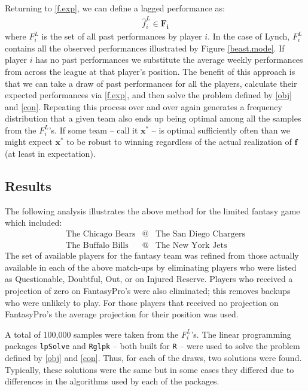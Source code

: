 \documentclass[10pt]{article}
\begin{document}
Returning to \eqref{f.exp}, we can define a lagged performance as:
\begin{gather}
\hat f_i^L \in \bm{F_i}
\end{gather}
where $F_i^L$ is the set of all past performances by player $i$.  In the case of Lynch, $F_i^L$ contains all the observed performances illustrated by Figure \ref{beast.mode}.  If player $i$ has no past performances we substitute the average weekly performances from across the league at that player's position.  The benefit of this approach is that we can take a draw of past performances for all the players, calculate their expected performances via \eqref{f.exp}, and then solve the problem defined by \eqref{obj} and \eqref{con}.  Repeating this process over and over again generates a frequency distribution that a given team also ends up being optimal among all the samples from the $F_i^L$'s.  If some team -- call it $\bm{x^*} $ -- is optimal sufficiently often than we might expect $\bm{x^*}$ to be robust to winning regardless of the actual realization of $\bm{f}$ (at least in expectation).

\subsection*{Results}

The following analysis illustrates the above method for the limited fantasy game which included:
\[
\begin{array}{rcl}
\text{The Chicago Bears} & \text{@} & \text{The San Diego Chargers} \\
\text{The Buffalo Bills} & \text{@} & \text{The New York Jets} 
\end{array}
\]
The set of available players for the fantasy team was refined from those actually available in each of the above match-ups by eliminating players who were listed as Questionable, Doubtful, Out, or on Injured Reserve.  Players who received a projection of zero on FantasyPro's were also eliminated; this removes backups who were unlikely to play.  For those players that received no projection on FantasyPro's the average projection for their position was used.

A total of 100,000 samples were taken from the $F_i^L$'s.  The linear programming packages \texttt{lpSolve} and \texttt{Rglpk} -- both built for \texttt{R} -- were used to solve the problem defined by \eqref{obj} and \eqref{con}.  Thus, for each of the draws, two solutions were found.  Typically, these solutions were the same but in some cases they differed due to differences in the algorithms used by each of the packages.
\end{document}
